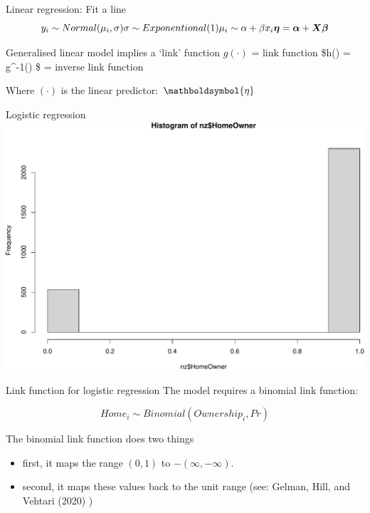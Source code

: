 \documentclass[
  ignorenonframetext,
]{beamer}
\providecommand{\tightlist}{%
  \setlength{\itemsep}{0pt}\setlength{\parskip}{0pt}}
\begin{document}
\begin{frame}[fragile]
\begin{block}{Linear regression: Fit a line}
\protect\hypertarget{linear-regression-fit-a-line}{}
\[
y_i \sim Normal ( \mu_i, \sigma)\\
\sigma \sim Exponentional (1) \\
\mu_i \sim \alpha + \beta x_i \\
\boldsymbol{\eta} =  \boldsymbol{\alpha} + \boldsymbol{X}\boldsymbol{\beta}\\
\]
\end{block}

\begin{block}{Generalised linear model implies a `link' function}
\protect\hypertarget{generalised-linear-model-implies-a-link-function}{}
\(g(\cdot)\) = link function \$h(\cdot) = g\^{}-1(\cdot) \$ = inverse
link function

Where \((\cdot)\) is the linear predictor: \(\mathboldsymbol{\eta}\)
\end{block}

\begin{block}{Logistic regression}
\protect\hypertarget{logistic-regression}{}
\includegraphics{slides_files/figure-beamer/unnamed-chunk-1-1.pdf}
\end{block}

\begin{block}{Link function for logistic regression}
\protect\hypertarget{link-function-for-logistic-regression}{}
The model requires a binomial link function:

\[Home_i \sim Binomial (Ownership_i, Pr)\]
\end{block}

\begin{block}{The binomial link function does two things}
\protect\hypertarget{the-binomial-link-function-does-two-things}{}
\begin{itemize}[<+->]
\tightlist
\item
  first, it maps the range \((0, 1)\) to \(-(\infty, -\infty)\).
\item
  second, it maps these values back to the unit range (see: Gelman,
  Hill, and Vehtari (2020) )
\end{itemize}
\end{block}


\end{frame}
\end{document}
